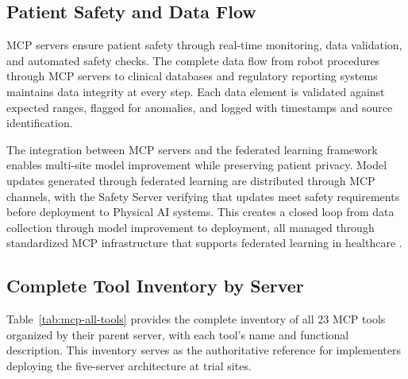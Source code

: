 \subsection{Patient Safety and Data Flow}
\label{subsec:mcp-patient-safety}

MCP servers ensure patient safety through real-time monitoring, data
validation, and automated safety checks. The complete data flow from robot
procedures through MCP servers to clinical databases and regulatory reporting
systems maintains data integrity at every step. Each data element is validated
against expected ranges, flagged for anomalies, and logged with timestamps and
source identification.

The integration between MCP servers and the federated learning framework
\cite{fl-paper} enables multi-site model improvement while preserving patient
privacy. Model updates generated through federated learning are distributed
through MCP channels, with the Safety Server verifying that updates meet safety
requirements before deployment to Physical AI systems. This creates a closed
loop from data collection through model improvement to deployment, all managed
through standardized MCP infrastructure that supports federated learning in
healthcare \cite{federated-learning-healthcare}.

\subsection{Complete Tool Inventory by Server}
\label{subsec:mcp-tool-inventory}

Table~\ref{tab:mcp-all-tools} provides the complete inventory of all 23 MCP
tools organized by their parent server, with each tool's name and functional
description. This inventory serves as the authoritative reference for
implementers deploying the five-server architecture at trial sites.

